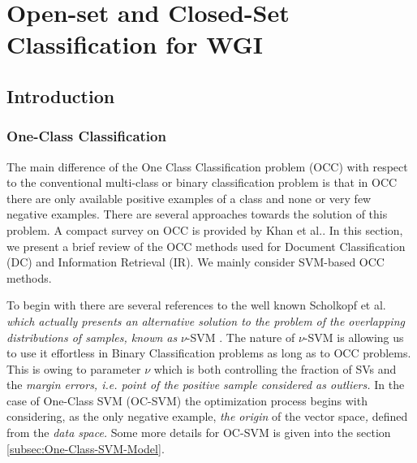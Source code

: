 
\chapter{Open-set and Closed-Set Classification for WGI}

\label{chap:relevant_work}


\newcommand{\keyword}[1]{\textbf{#1}}
\newcommand{\tabhead}[1]{\textbf{#1}}
\newcommand{\code}[1]{\texttt{#1}}
\newcommand{\file}[1]{\texttt{\bfseries#1}}
\newcommand{\option}[1]{\texttt{\itshape#1}}


\section{Introduction}\label{chap:relevant_work:sec:intro}

\subsection{One-Class Classification\label{subsec:One-Class-Classification}}

The main difference of the One Class Classification problem (OCC) with respect to the conventional multi-class or binary classification problem is that in OCC there are only available positive examples of a class and none or very few negative examples. There are several approaches towards the solution of this problem. A compact survey on OCC is provided by Khan et al.\cite{khan2010survey}. In this section, we present a brief review of the OCC methods used for Document Classification (DC) and Information Retrieval (IR). We mainly consider SVM-based OCC methods.

To begin with there are several references to the well known Scholkopf et al.\cite{scholkopf1999estimating} \textit{which actually presents an alternative solution to the problem of the overlapping distributions of samples, known as }$\nu$-SVM \cite{bishop2006}. The nature of $\nu$-SVM is allowing us to use it effortless in Binary Classification problems as long as to OCC problems. This is owing to parameter $\nu$ which is both controlling the fraction of SVs and the \textit{margin errors, i.e. point of the positive sample considered as outliers. }In the case of One-Class SVM (OC-SVM) the optimization process begins with considering, as the only negative example, \textit{the origin }of the vector space\textit{, }defined from the \textit{data space. }Some more details for OC-SVM is given into the section \ref{subsec:One-Class-SVM-Model}.

